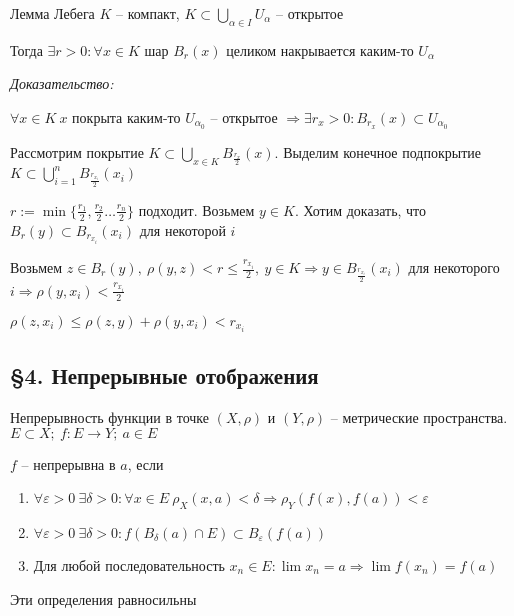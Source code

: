 \documentclass[12pt]{article}
\begin{document}
\begin{lem}{Лемма Лебега}
    $K$ -- компакт, $K \subset \bigcup\limits_{\alpha \in I} U_\alpha$ -- открытое 

    Тогда $\exists r > 0 : \forall x \in K$ шар $B_r(x)$ целиком накрывается каким-то $U_\alpha$
\end{lem}

\textit{Доказательство:}

$\forall x \in K\ x$ покрыта каким-то $U_{\alpha_0}$ -- открытое $\Rightarrow \exists r_x > 0 : B_{r_x}(x) \subset U_{\alpha_0}$

Рассмотрим покрытие $K \subset \bigcup\limits_{x \in K} B_{\frac{r_x}{2}}(x)$. Выделим конечное подпокрытие $K \subset \bigcup\limits_{i = 1}^n B_{\frac{r_{x_i}}{2}}(x_i)$

$r := \min\{\frac{r_1}{2}, \frac{r_2}{2} \ldots \frac{r_n}{2}\}$ подходит. Возьмем $y \in K$. Хотим доказать, что $B_r(y) \subset B_{r_{x_i}}(x_i)$ для некоторой $i$

Возьмем $z \in B_r(y),\ \rho(y, z) < r \leq \frac{r_{x_i}}{2},\ y \in K \Rightarrow y \in B_{\frac{r_{x_i}}{2}}(x_i)$ для некоторого $i \Rightarrow \rho(y, x_i) < \frac{r_{x_i}}{2}$

$\rho(z, x_i) \leq \rho(z, y) + \rho(y, x_i) < r_{x_i}$

\subsection{\S 4. Непрерывные отображения}

\begin{defin}{Непрерывность функции в точке}
    $(X, \rho)$ и $(Y, \rho)$ -- метрические пространства. $E \subset X;\ f : E \to Y;\ a \in E$

    $f$ -- непрерывна в $a$, если

    \begin{enumerate}
        \item $\forall \varepsilon > 0\ \exists \delta > 0 : \forall x \in E\ \rho_X(x, a) < \delta \Rightarrow \rho_Y(f(x), f(a)) < \varepsilon$
        \item $\forall \varepsilon > 0\ \exists \delta > 0 : f(B_\delta(a) \cap E) \subset B_\varepsilon(f(a))$
        \item Для любой последовательность $x_n \in E : \lim x_n = a \Rightarrow \lim f(x_n) = f(a)$
    \end{enumerate}
\end{defin}

\begin{theo}{}
    Эти определения равносильны
\end{theo}
\end{document}
